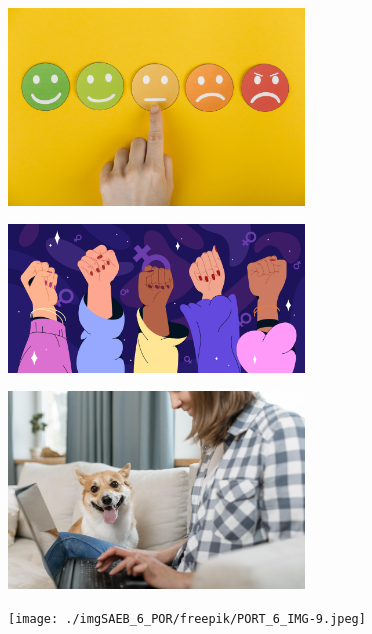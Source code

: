 \begin{figure}
\includegraphics[width=0.7\textwidth]{./imgSAEB_6_POR/freepik/PORT_6_IMG-6.jpeg}
\end{figure}

\begin{figure}
\includegraphics[width=0.7\textwidth]{./imgSAEB_6_POR/freepik/PORT_6_IMG-7.jpeg}
\end{figure}

\begin{figure}
\includegraphics[width=0.7\textwidth]{./imgSAEB_6_POR/freepik/PORT_6_IMG-8.jpeg}
\end{figure}

\begin{figure}
\texttt{[image: ./imgSAEB\_6\_POR/freepik/PORT\_6\_IMG-9.jpeg]}
\end{figure}

